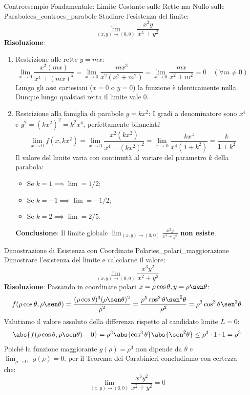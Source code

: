 \begin{esempio}{Controesempio Fondamentale: Limite Costante sulle Rette ma Nullo sulle Parabole}{es_controes_parabole}
Studiare l'esistenza del limite:
\[
\lim_{(x,y) \to (0,0)} \frac{x^2 y}{x^4 + y^2}
\]
\textbf{Risoluzione}:
\begin{enumerate}
    \item Restrizione alle rette $y = mx$:
    \[
    \lim_{x \to 0} \frac{x^2 (mx)}{x^4 + (mx)^2} = \lim_{x \to 0} \frac{m x^3}{x^2(x^2 + m^2)} = \lim_{x \to 0} \frac{m x}{x^2 + m^2} = 0 \quad (\forall m \neq 0)
    \]
    Lungo gli assi cartesiani ($x=0$ o $y=0$) la funzione è identicamente nulla. Dunque lungo qualsiasi retta il limite vale $0$.
    \item Restrizione alla famiglia di parabole $y = k x^2$:
    I gradi a denominatore sono $x^4$ e $y^2 = (k x^2)^2 = k^2 x^4$, perfettamente bilanciati!
    \[
    \lim_{x \to 0} f(x, k x^2) = \lim_{x \to 0} \frac{x^2 (k x^2)}{x^4 + (k x^2)^2} = \lim_{x \to 0} \frac{k x^4}{x^4(1 + k^2)} = \frac{k}{1 + k^2}
    \]
    Il valore del limite varia con continuità al variare del parametro $k$ della parabola:
    \begin{itemize}
        \item Se $k = 1 \implies \lim = 1/2$;
        \item Se $k = -1 \implies \lim = -1/2$;
        \item Se $k = 2 \implies \lim = 2/5$.
    \end{itemize}
    \textbf{Conclusione}: Il limite globale $\lim_{(x,y) \to (0,0)} \frac{x^2 y}{x^4 + y^2}$ \textbf{non esiste}.
\end{enumerate}
\end{esempio}

\begin{esempio}{Dimostrazione di Esistenza con Coordinate Polari}{es_polari_maggiorazione}
Dimostrare l'esistenza del limite e calcolarne il valore:
\[
\lim_{(x,y) \to (0,0)} \frac{x^3 y^2}{x^2 + y^2}
\]
\textbf{Risoluzione}:
Passando in coordinate polari $x = \rho\cos\theta, y = \rho\sen\theta$:
\[
f(\rho\cos\theta, \rho\sen\theta) = \frac{(\rho\cos\theta)^3 (\rho\sen\theta)^2}{\rho^2} = \frac{\rho^5 \cos^3\theta \sen^2\theta}{\rho^2} = \rho^3 \cos^3\theta \sen^2\theta
\]
Valutiamo il valore assoluto della differenza rispetto al candidato limite $L = 0$:
\[
\abs{f(\rho\cos\theta, \rho\sen\theta) - 0} = \rho^3 \abs{\cos^3\theta} \abs{\sen^2\theta} \le \rho^3 \cdot 1 \cdot 1 = \rho^3
\]
Poiché la funzione maggiorante $g(\rho) = \rho^3$ non dipende da $\theta$ e $\lim_{\rho \to 0^+} g(\rho) = 0$, per il Teorema dei Carabinieri concludiamo con certezza che:
\[
\lim_{(x,y) \to (0,0)} \frac{x^3 y^2}{x^2 + y^2} = 0
\]
\end{esempio}

